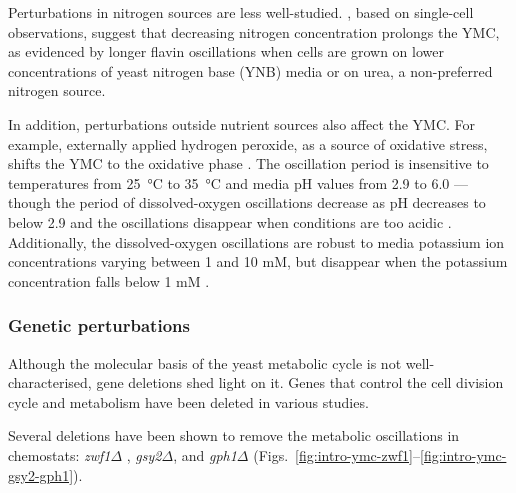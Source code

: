 Perturbations in nitrogen sources are less well-studied.
\textcite{baumgartnerFlavinbasedMetabolicCycles2018}, based on single-cell observations, suggest that decreasing nitrogen concentration prolongs the YMC, as evidenced by longer flavin oscillations when cells are grown on lower concentrations of yeast nitrogen base (YNB) media or on urea, a non-preferred nitrogen source.

In addition, perturbations outside nutrient sources also affect the YMC.\@
For example, externally applied hydrogen peroxide, as a source of oxidative stress, shifts the YMC to the oxidative phase \parencite{amponsahPeroxiredoxinsCoupleMetabolism2021}.
The oscillation period is insensitive to temperatures from \SI{25}{\celsius} to \SI{35}{\celsius} and media pH values from
2.9 to 6.0 \parencite{lloydUltradianMetronomeTimekeeper2005} --- though the period of dissolved-oxygen oscillations decrease as pH decreases to below 2.9 and the oscillations disappear when conditions are too acidic \parencite{oneillEukaryoticCellBiology2020}.
Additionally, the dissolved-oxygen oscillations are robust to media potassium ion concentrations varying between 1 and 10 mM, but disappear when the potassium concentration falls below 1 mM \parencite{oneillEukaryoticCellBiology2020}.


\subsubsection{Genetic perturbations}
\label{subsubsec:intro-ymc-perturbations-genetic}

Although the molecular basis of the yeast metabolic cycle is not well-characterised, gene deletions shed light on it.
Genes that control the cell division cycle and metabolism have been deleted in various studies.

Several deletions have been shown to remove the metabolic oscillations in chemostats: \textit{zwf1$\Delta$} \parencite{tuCyclicChangesMetabolic2007}, \textit{gsy2$\Delta$}, and \textit{gph1$\Delta$} \parencite{oneillEukaryoticCellBiology2020} (Figs.\ \ref{fig:intro-ymc-zwf1}--\ref{fig:intro-ymc-gsy2-gph1}).


